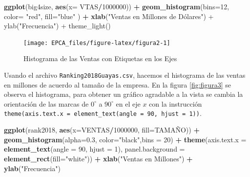 \documentclass[
]{krantz}
\makeatletter
\newenvironment{Shaded}{\begin{snugshade}}{\end{snugshade}}
\newcommand{\DataTypeTok}[1]{\textcolor[rgb]{0.27,0.27,0.27}{#1}}
\newcommand{\DecValTok}[1]{\textcolor[rgb]{0.06,0.06,0.06}{#1}}
\newcommand{\FloatTok}[1]{\textcolor[rgb]{0.06,0.06,0.06}{#1}}
\newcommand{\KeywordTok}[1]{\textcolor[rgb]{0.27,0.27,0.27}{\textbf{#1}}}
\newcommand{\NormalTok}[1]{#1}
\newcommand{\OperatorTok}[1]{\textcolor[rgb]{0.43,0.43,0.43}{\textbf{#1}}}
\newcommand{\StringTok}[1]{\textcolor[rgb]{0.5,0.5,0.5}{#1}}
\newenvironment{kframe}{%
\medskip{}
\setlength{\fboxsep}{.8em}
 \def\at@end@of@kframe{}%
 \ifinner\ifhmode%
  \def\at@end@of@kframe{\end{minipage}}%
  \begin{minipage}{\columnwidth}%
 \fi\fi%
 \def\FrameCommand##1{\hskip\@totalleftmargin \hskip-\fboxsep
 \colorbox{shadecolor}{##1}\hskip-\fboxsep
     \hskip-\linewidth \hskip-\@totalleftmargin \hskip\columnwidth}%
 \MakeFramed {\advance\hsize-\width
   \@totalleftmargin\z@ \linewidth\hsize
   \@setminipage}}%
 {\par\unskip\endMakeFramed%
 \at@end@of@kframe}
\renewenvironment{Shaded}{\begin{kframe}}{\end{kframe}}
\makeatother
\begin{document}
\begin{Shaded}
\begin{Highlighting}[]
\KeywordTok{ggplot}\NormalTok{(big4size, }\KeywordTok{aes}\NormalTok{(}\DataTypeTok{x=}\NormalTok{ VTAS}\OperatorTok{/}\DecValTok{1000000}\NormalTok{)) }\OperatorTok{+}\StringTok{ }
\StringTok{  }\KeywordTok{geom_histogram}\NormalTok{(}\DataTypeTok{bins=}\DecValTok{12}\NormalTok{, }\DataTypeTok{color=} \StringTok{"red"}\NormalTok{,  }\DataTypeTok{fill=}\StringTok{"blue"}\NormalTok{ ) }\OperatorTok{+}\StringTok{ }
\StringTok{  }\KeywordTok{xlab}\NormalTok{(}\StringTok{"Ventas en Millones de Dólares") + ylab("}\NormalTok{Frecuencia}\StringTok{") +}
\StringTok{  theme_light()}
\end{Highlighting}
\end{Shaded}

\begin{figure}[h!]

{\centering \texttt{[image: EPCA\_files/figure-latex/figura2-1]} 

}

\caption{Histograma de las Ventas con Etiquetas en los Ejes}\label{fig:figura2}
\end{figure}

Usando el archivo \texttt{Ranking2018Guayas.csv}, hacemos el histograma de las ventas en millones de acuerdo al tamaño de la empresa. En la figura \ref{fig:figura3} se observa el histograma, para obtener un gráfico agradable a la vista se cambia la orientación de las marcas de \(0^\circ\) a \(90^\circ\) en el eje \(x\) con la instrucción \texttt{theme(axis.text.x\ =\ element\_text(angle\ =\ 90,\ hjust\ =\ 1))}.

\begin{Shaded}
\begin{Highlighting}[]
\KeywordTok{ggplot}\NormalTok{(rank2018, }\KeywordTok{aes}\NormalTok{(}\DataTypeTok{x=}\NormalTok{VENTAS}\OperatorTok{/}\DecValTok{1000000}\NormalTok{, }\DataTypeTok{fill=}\NormalTok{TAMAÑO)) }\OperatorTok{+}\StringTok{ }
\StringTok{  }\KeywordTok{geom_histogram}\NormalTok{(}\DataTypeTok{alpha=}\FloatTok{0.3}\NormalTok{, }\DataTypeTok{color=}\StringTok{"black"}\NormalTok{,}\DataTypeTok{bins =} \DecValTok{20}\NormalTok{) }\OperatorTok{+}
\StringTok{  }\KeywordTok{theme}\NormalTok{(}\DataTypeTok{axis.text.x =} \KeywordTok{element_text}\NormalTok{(}\DataTypeTok{angle =} \DecValTok{90}\NormalTok{, }\DataTypeTok{hjust =} \DecValTok{1}\NormalTok{), }
        \DataTypeTok{panel.background =} \KeywordTok{element_rect}\NormalTok{(}\DataTypeTok{fill=}\StringTok{"white"}\NormalTok{)) }\OperatorTok{+}
\StringTok{  }\KeywordTok{xlab}\NormalTok{(}\StringTok{"Ventas en Millones"}\NormalTok{) }\OperatorTok{+}\StringTok{ }\KeywordTok{ylab}\NormalTok{(}\StringTok{"Frecuencia"}\NormalTok{) }
\end{Highlighting}
\end{Shaded}
\end{document}
